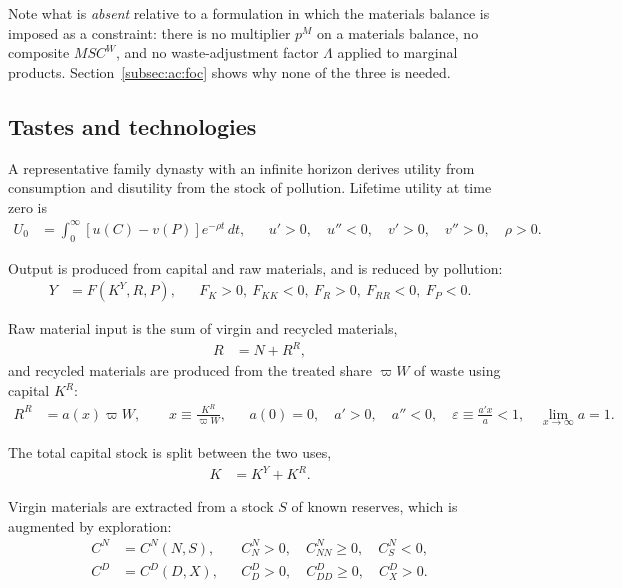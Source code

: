 Note what is \emph{absent} relative to a formulation in which the materials balance is imposed as a constraint: there is no multiplier $p^M$ on a materials balance, no composite $MSC^W$, and no waste-adjustment factor $\Lambda$ applied to marginal products. Section~\ref{subsec:ac:foc} shows why none of the three is needed.

\subsection{Tastes and technologies}
\label{subsec:ac:primitives}

 A representative family dynasty with an infinite horizon derives utility from consumption and disutility from the stock of pollution. Lifetime utility at time zero is
\begin{align}
U_0 &= \int_0^{\infty}\left[u(C)-v(P)\right]e^{-\rho t}\,dt,
&&
u'>0,\quad u''<0,\quad v'>0,\quad v''>0,\quad \rho>0.
\label{eq:ac:utility}
\end{align}

 Output is produced from capital and raw materials, and is reduced by pollution:
\begin{align}
Y &= F\left(K^Y,R,P\right),
&&
F_K>0,\ F_{KK}<0,\ F_R>0,\ F_{RR}<0,\ F_P<0.
\label{eq:ac:output}
\end{align}

 Raw material input is the sum of virgin and recycled materials,
\begin{align}
R &= N + R^R,
\label{eq:ac:materials}
\end{align}
and recycled materials are produced from the treated share $\varpi W$ of waste using capital $K^R$:
\begin{align}
R^R &= a\!\left(x\right)\varpi W,
\qquad
x\equiv\frac{K^R}{\varpi W},
&&
a(0)=0,\quad a'>0,\quad a''<0,\quad
\varepsilon\equiv \frac{a'x}{a}<1,\quad
\lim_{x\to\infty}a=1.
\label{eq:ac:recycling}
\end{align}

 The total capital stock is split between the two uses,
\begin{align}
K &= K^Y + K^R.
\label{eq:ac:capital-allocation}
\end{align}

 Virgin materials are extracted from a stock $S$ of known reserves, which is augmented by exploration:
\begin{align}
C^N &= C^N(N,S),
&&
C^N_N>0,\quad C^N_{NN}\ge 0,\quad C^N_S<0,
\label{eq:ac:extraction-cost}
\\
C^D &= C^D(D,X),
&&
C^D_D>0,\quad C^D_{DD}\ge 0,\quad C^D_X>0.
\label{eq:ac:discovery-cost}
\end{align}

